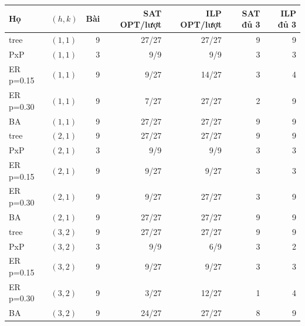 \begin{tabular}{llrrrrr}
\toprule
Họ & $(h,k)$ & Bài & SAT OPT/lượt & ILP OPT/lượt & SAT đủ 3 & ILP đủ 3\\
\midrule
tree & $(1,1)$ & 9 & 27/27 & 27/27 & 9 & 9\\
PxP & $(1,1)$ & 3 & 9/9 & 9/9 & 3 & 3\\
ER p=0.15 & $(1,1)$ & 9 & 9/27 & 14/27 & 3 & 4\\
ER p=0.30 & $(1,1)$ & 9 & 7/27 & 27/27 & 2 & 9\\
BA & $(1,1)$ & 9 & 27/27 & 27/27 & 9 & 9\\
tree & $(2,1)$ & 9 & 27/27 & 27/27 & 9 & 9\\
PxP & $(2,1)$ & 3 & 9/9 & 9/9 & 3 & 3\\
ER p=0.15 & $(2,1)$ & 9 & 9/27 & 9/27 & 3 & 3\\
ER p=0.30 & $(2,1)$ & 9 & 9/27 & 27/27 & 3 & 9\\
BA & $(2,1)$ & 9 & 27/27 & 27/27 & 9 & 9\\
tree & $(3,2)$ & 9 & 27/27 & 27/27 & 9 & 9\\
PxP & $(3,2)$ & 3 & 9/9 & 6/9 & 3 & 2\\
ER p=0.15 & $(3,2)$ & 9 & 9/27 & 9/27 & 3 & 3\\
ER p=0.30 & $(3,2)$ & 9 & 3/27 & 12/27 & 1 & 4\\
BA & $(3,2)$ & 9 & 24/27 & 27/27 & 8 & 9\\
\bottomrule
\end{tabular}

